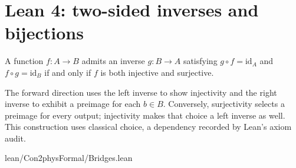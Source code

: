 \section{Lean 4: two-sided inverses and bijections}
\label{sec:lean-bridge-07}
A function $f:A\to B$ admits an inverse $g:B\to A$ satisfying
$g\circ f=\mathrm{id}_A$ and $f\circ g=\mathrm{id}_B$
if and only if $f$ is both injective and surjective.

The forward direction uses the left inverse to show injectivity
and the right inverse to exhibit a preimage for each $b\in B$.
Conversely, surjectivity selects a preimage for every output;
injectivity makes that choice a left inverse as well.
This construction uses classical choice, a dependency recorded
by Lean's axiom audit.


{lean/Con2physFormal/Bridges.lean}
